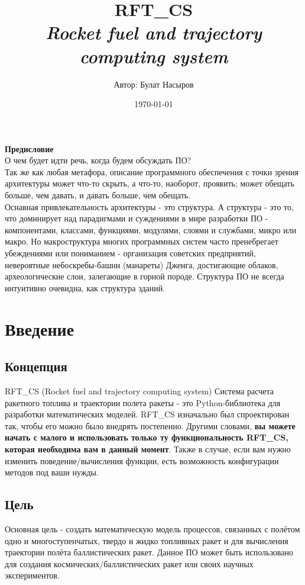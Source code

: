 \documentclass[a4paper, 12pt]{report}
\author{Автор: Булат Насыров}
\title{RFT\_CS \\ \footnotesize{\textit{Rocket fuel and trajectory computing system}}}
\date{\today}
\begin{document}
\maketitle

\tableofcontents{}
\clearpage
{\bfseries\Huge Предисловие}\\

\textrm{
    О чем будет идти речь, когда будем обсуждать ПО?\\
    Так же как любая метафора, описание программного обеспечения с точки зрения архитектуры может что-то скрыть, а что-то, наоборот, проявить; может обещать больше, чем давать, и давать больше, чем обещать. \\
    Оснавная привлекательность архитектуры - это структура. А структура - это то, что доминирует над парадигмами и суждениями в мире разработки ПО - компонентами, классами, функциями, модулями, слоями и службами, микро или макро. Но макроструктура многих программных систем часто пренебрегает убеждениями или пониманием - организация советских предприятий, невероятные небоскребы-башни (манареты) Дженга, достигающие облаков, археологические слои, залегающие в горной породе. Структура ПО не всегда интуитивно очевидна, как структура зданий.
}

\chapter{Введение}
\section{Концепция}
\textrm{
    RFT\_CS (Rocket fuel and trajectory computing system) Система расчета ракетного топлива и траектории полета ракеты - это Python-библиотека для разработки математических моделей. RFT\_CS изначально был спроектирован так, чтобы его можно было внедрять постепенно. Другими словами, \textbf{вы можете начать с малого и использовать только ту функциональность RFT\_CS, которая необходима вам в данный момент}. Также в случае, если вам нужно изменить поведение/вычисления функции, есть возможность конфигурации методов под ваши нужды.
}
\section{Цель}
\textrm{
    Основная цель - создать математическую модель процессов, связанных с полётом одно и многоступенчатых, твердо и жидко топливных ракет и для вычисления траектории полёта баллистических ракет. Данное ПО может быть использовано для создания космических/баллистических ракет или своих научных экспериментов.
}
\end{document}
